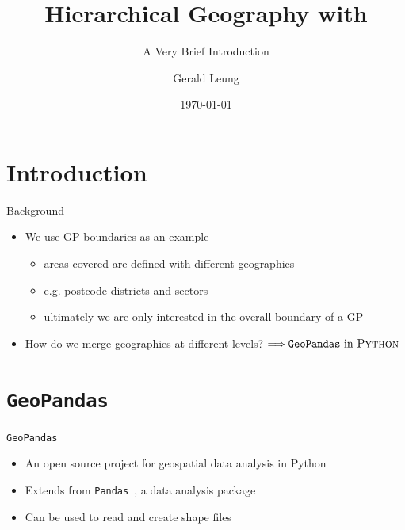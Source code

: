 \documentclass[hyperref={breaklinks,colorlinks,
   urlcolor=blue,citecolor=blue,linkcolor=red}]{beamer}
\title[Hierarchical Geography]
{Hierarchical Geography with \Python}
\subtitle{A Very Brief Introduction}
\author[Gerald Leung]{Gerald Leung\inst{1}} %
\institute[PHS Geospatial]{\inst{1}Public Health Scotland}%
\date[\today]{\today}
\newcommand{\Python}{{\sc Python}\xspace}
\begin{document}
\begin{frame}
\titlepage
\end{frame}




\section{Introduction}

\begin{frame}{Background}
\begin{itemize}
\item{We use GP boundaries as an example}
\begin{itemize}
\item{areas covered are defined with different geographies}
\item{e.g. postcode districts and sectors}
\item{ultimately we are only interested in the overall boundary of a GP}
\end{itemize}
\item{How do we merge geographies at different levels?}
$\Longrightarrow \textrm{\texttt{GeoPandas} in \Python}$
\end{itemize}
\end{frame}

\section{\texttt{GeoPandas}}
\begin{frame}{\texttt{GeoPandas}}
\begin{itemize}
\item{An open source project for geospatial data analysis in \Python~\citep{kelsey_jordahl_2020_3946761}}
\item{Extends from \texttt{Pandas}~\citep{pandas},
a data analysis package}
\item{Can be used to read and create shape files}
\end{itemize}
\end{frame}
\end{document}
